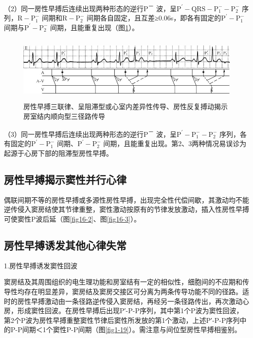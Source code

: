 （2）同一房性早搏后连续出现两种形态的逆行P\textsuperscript{－}
波，呈$\text{P}^\prime-\text{QRS}-\text{P}_1^--\text{P}_2^-$
序列，$\text{R}-\text{P}_1^-$
间期和$\text{R}-\text{P}_2^-$
间期各自固定，且互差≥0.06s，即各有固定的$\text{P}^\prime-\text{P}_1^-$
间期与$\text{P}^\prime-\text{P}_2^-$
间期，且能重复出现（图\ref{fig11-12}）。

\begin{figure}[!htbp]
 \centering
 \includegraphics[width=5.58333in,height=1.29167in]{./images/Image00169.jpg}
 \captionsetup{justification=centering}
 \caption{房性早搏三联律、呈阻滞型或心室内差异性传导、房性反复搏动揭示房室结内顺向型三径路传导}
 \label{fig11-12}
  \end{figure} 

（3）同一房性早搏后连续出现两种形态的逆行P\textsuperscript{－}
波，呈$\text{P}^\prime-\text{P}_1^--\text{P}_2^-$
序列，各有固定的$\text{P}^\prime-\text{P}_1^-$
间期、$\text{P}^\prime-\text{P}_2^-$
间期，且能重复出现。第2、3两种情况易误诊为起源于心房下部的阻滞型房性早搏。

\protect\hypertarget{text00018.htmlux5cux23subid140}{}{}

\subsection{房性早搏揭示窦性并行心律}

偶联间期不等的房性早搏或多源性房性早搏，出现完全性代偿间歇，其激动均不能逆传侵入窦房结使其节律重整，窦性激动按原有的节律发放激动，插入性房性早搏可使窦性P波后延（图\ref{fig16-2}、图\ref{fig16-3}）。

\protect\hypertarget{text00018.htmlux5cux23subid141}{}{}

\subsection{房性早搏诱发其他心律失常}

1.房性早搏诱发窦性回波

窦房结及其周围组织的电生理功能和房室结有一定的相似性，细胞间的不应期和传导性均存在明显差异，窦房结及窦房交接区可分离为两条传导功能不同的径路。适时的房性早搏激动由一条径路逆传侵入窦房结，再经另一条径路传出，再次激动心房，形成窦性回波。在房性早搏后出现P′-P-P序列，其中第1个P波为窦性回波，第2个P波为房性早搏重整窦性节律后窦性所发放的第1个激动，上述P′-P-P序列中的P-P间期＜1个窦性P-P间期（图\ref{fig1-19}）。需注意与间位型房性早搏相鉴别。

